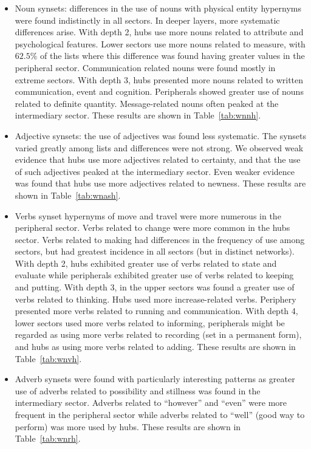 \documentclass[review]{elsarticle}
\begin{document}
\begin{itemize}
\item Noun synsets: differences in the use of nouns with physical entity hypernyms were found indistinctly in all sectors.
In deeper layers, more systematic differences arise.
With depth 2, hubs use more nouns related to attribute and psychological features.
Lower sectors use more nouns related to measure,
with $62.5\%$ of the lists where this difference was found having greater values in the peripheral sector.
Communication related nouns were found mostly in extreme sectors.
With depth 3, hubs presented more nouns related to written communication, event and cognition.
Peripherals showed greater use of nouns related to definite quantity.
Message-related nouns often peaked at the intermediary sector.
These results are shown in Table~\ref{tab:wnnh}.

\FloatBarrier
\item Adjective synsets: the use of adjectives was found less systematic.
The synsets varied greatly among lists and differences were not strong.
We observed weak evidence that hubs use more adjectives related to certainty,
and that the use of such adjectives peaked at the intermediary sector.
Even weaker evidence was found that hubs use more adjectives related to newness.
These results are shown in Table~\ref{tab:wnash}.

\FloatBarrier
\item Verbs synset hypernyms of move and travel were more numerous in the peripheral sector.
Verbs related to change were more common in the hubs sector.
Verbs related to making had differences in the frequency of use among sectors,
but had greatest incidence in all sectors (but in distinct networks).
With depth 2, hubs exhibited greater use of verbs related to state and evaluate while
peripherals exhibited greater use of verbs related to keeping and putting.
With depth 3, in the upper sectors was found a greater use of verbs related to thinking.
Hubs used more increase-related verbs.
Periphery presented more verbs related to running and communication.
With depth 4, lower sectors used more verbs related to informing, peripherals might be regarded as using more verbs related to recording (set in a permanent form), and hubs as using more verbs related to adding.
These results are shown in Table~\ref{tab:wnvh}.

\FloatBarrier
\item Adverb synsets were found with particularly interesting patterns as greater use of adverbs related to possibility and stillness was found in the intermediary sector.
Adverbs related to ``however'' and ``even'' were more frequent in the peripheral sector while adverbs related to ``well'' (good way to perform) was more used by hubs.
These results are shown in Table~\ref{tab:wnrh}.

\FloatBarrier
\end{itemize}
\end{document}
